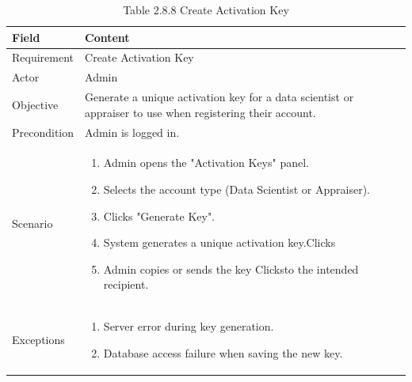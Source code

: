 \documentclass[12pt,oneside]{report}
\begin{document}
\begin{table}[H]
\centering
\caption{Table 2.8.8 Create Activation Key}
\label{tab:admin-create-key}
\begin{tabularx}{\textwidth}{|p{3cm}|X|}
\hline
\textbf{Field} & \textbf{Content} \\ \hline

Requirement & Create Activation Key \\ \hline

Actor & Admin \\ \hline

Objective & Generate a unique activation key for a data scientist or appraiser to use when registering their account. \\ \hline

Precondition & Admin is logged in. \\ \hline

Scenario &
\begin{minipage}[t]{0.75\textwidth}
\begin{enumerate}[leftmargin=*,label=\arabic*.]
\item Admin opens the "Activation Keys" panel.
\item Selects the account type (Data Scientist or Appraiser).
\item Clicks "Generate Key".
\item System generates a unique activation key.Clicks
\item Admin copies or sends the key Clicksto the intended recipient.
\end{enumerate}
\end{minipage} \\ \hline
Exceptions &
\begin{minipage}[t]{0.75\textwidth}
\begin{enumerate}[leftmargin=*,label=\arabic*.]
\item Server error during key generation.
\item Database access failure when saving the new key.

\end{enumerate}
\end{minipage} \\ \hline
\end{tabularx}
\end{table}
\end{document}
